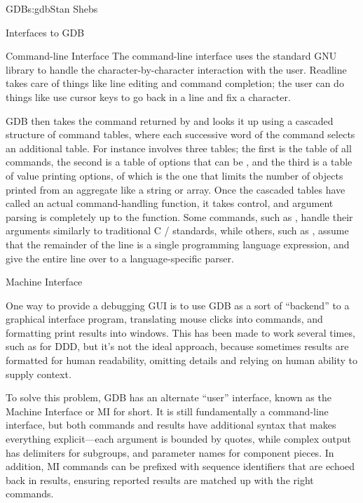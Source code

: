 \begin{aosachapter}{GDB}{s:gdb}{Stan Shebs}
\begin{aosasect1}{Interfaces to GDB}
\begin{aosasect2}{Command-line Interface}
The command-line interface uses the standard GNU library
 to handle the character-by-character interaction with
the user.  Readline takes care of things like line editing and command
completion; the user can do things like use cursor keys to go back in
a line and fix a character.

GDB then takes the command returned by  and looks it up
using a cascaded structure of command tables, where each successive
word of the command selects an additional table.  For instance
 involves three tables; the first is the
table of all commands, the second is a table of options that can be
, and the third is a table of value printing options, of
which  is the one that limits the number of objects
printed from an aggregate like a string or array.  Once the cascaded
tables have called an actual command-handling function, it takes
control, and argument parsing is completely up to the function.  Some
commands, such as , handle their arguments similarly to
traditional C / standards, while others, such as
, assume that the remainder of the line is a single
programming language expression, and give the entire line over to a
language-specific parser.

\end{aosasect2}

\begin{aosasect2}{Machine Interface}

One way to provide a debugging GUI is to use GDB as a sort of
``backend'' to a graphical interface program, translating mouse clicks
into commands, and formatting print results into windows.  This has
been made to work several times, such as for DDD, but it's not the
ideal approach, because sometimes results are formatted for human
readability, omitting details and relying on human ability to supply
context.

To solve this problem, GDB has an alternate ``user'' interface, known
as the Machine Interface or MI for short.  It is still fundamentally a
command-line interface, but both commands and results have additional
syntax that makes everything explicit---each argument is bounded by
quotes, while complex output has delimiters for subgroups, and
parameter names for component pieces.  In addition, MI commands can be
prefixed with sequence identifiers that are echoed back in results,
ensuring reported results are matched up with the right commands.


\end{aosasect2}
\end{aosasect1}
\end{aosachapter}
